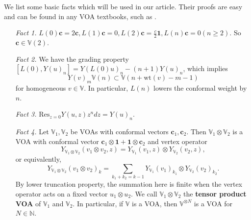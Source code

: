 \documentclass[11pt,b5paper,notitlepage]{article}
\theoremstyle{definition}
\theoremstyle{plain}
\newcommand{\Res}{\mathrm{Res}}
\newcommand{\Vbb}{\mathbb V}
\newcommand{\Nbb}{\mathbb N}
\newcommand{\cbf}{\mathbf c}
\newcommand{\wt}{\mathrm{wt}}
\newcommand{\ibf}{\mathbf 1}
\newcommand{\<}{\left\langle}
\renewcommand{\>}{\right\rangle}
\numberwithin{equation}{subsection}
\begin{document}
We list some basic facts which will be used in our article. Their proofs are easy and can be found in any VOA textbooks, such as \cite{FHL93}.
\begin{enumerate}[align=left]
    \item[\textit{Fact 1.}] $L(0)\cbf=2\cbf,L(1)\cbf=0,L(2)\cbf=\frac{c}{2}\ibf,L(n)\cbf=0(n\geq 2)$. So $\cbf\in \Vbb(2)$.
    \item[\textit{Fact 2.}] We have the grading property $[L(0),Y(u)_n]=Y(L(0)u)_n-(n+1)Y(u)_n$, which implies 
    $$
    Y(v)_m\Vbb(n)\subset \Vbb(n+\wt(v)-m-1)
    $$
    for homogeneous $v\in \Vbb$. In particular, $L(n)$ lowers the conformal weight by $n$.
    \item[\textit{Fact 3.}] $\Res_{z=0}Y(u,z)z^n dz=Y(u)_n$.
    \item[\textit{Fact 4.}] Let $\Vbb_1,\Vbb_2$ be VOAs with conformal vectors $\cbf_1,\cbf_2$. Then $\Vbb_1\otimes \Vbb_2$ is a VOA with conformal vector $\cbf_1\otimes \ibf+\ibf\otimes \cbf_2$ and vertex operator
    $$
    Y_{\Vbb_1\otimes \Vbb_2}(v_1\otimes v_2,z)=Y_{\Vbb_1}(v_1,z)\otimes Y_{\Vbb_2}(v_2,z),
    $$
    or equivalently,
    \begin{equation}\label{tensorproduct1}
    Y_{\Vbb_1\otimes \Vbb_2}(v_1\otimes v_2)_k=\sum_{k_1+k_2=k-1}Y_{\Vbb_1}(v_1)_{k_1}\otimes Y_{\Vbb_2}(v_2)_{k_2}.
    \end{equation}
    By lower truncation property, the summation here is finite when the vertex operator acts on a fixed vector $u_1\otimes u_2$. We call $\Vbb_1\otimes \Vbb_2$ the \textbf{tensor product VOA} of $\Vbb_1$ and $\Vbb_2$. In particular, if $\Vbb$ is a VOA, then $\Vbb^{\otimes N}$ is a VOA for $N\in \Nbb$.
\end{enumerate}
 
\end{document}
